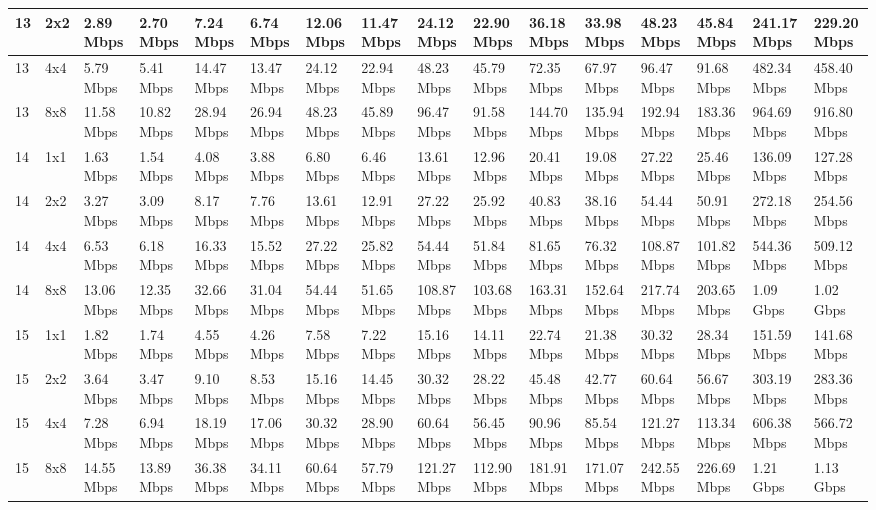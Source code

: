 \documentclass[12pt]{article}
\begin{document}
\begin{longtable}[c]{|l|l|l|l|l|l|l|l|l|l|l|l|l|l|l|l|}
13 & 2x2 & 2.89 Mbps & 2.70 Mbps & 7.24 Mbps & 6.74 Mbps & 12.06 Mbps & 11.47 Mbps & 24.12 Mbps & 22.90 Mbps & 36.18 Mbps & 33.98 Mbps & 48.23 Mbps & 45.84 Mbps & 241.17 Mbps & 229.20 Mbps \\ \hline
13 & 4x4 & 5.79 Mbps & 5.41 Mbps & 14.47 Mbps & 13.47 Mbps & 24.12 Mbps & 22.94 Mbps & 48.23 Mbps & 45.79 Mbps & 72.35 Mbps & 67.97 Mbps & 96.47 Mbps & 91.68 Mbps & 482.34 Mbps & 458.40 Mbps \\ \hline
13 & 8x8 & 11.58 Mbps & 10.82 Mbps & 28.94 Mbps & 26.94 Mbps & 48.23 Mbps & 45.89 Mbps & 96.47 Mbps & 91.58 Mbps & 144.70 Mbps & 135.94 Mbps & 192.94 Mbps & 183.36 Mbps & 964.69 Mbps & 916.80 Mbps \\ \hline
14 & 1x1 & 1.63 Mbps & 1.54 Mbps & 4.08 Mbps & 3.88 Mbps & 6.80 Mbps & 6.46 Mbps & 13.61 Mbps & 12.96 Mbps & 20.41 Mbps & 19.08 Mbps & 27.22 Mbps & 25.46 Mbps & 136.09 Mbps & 127.28 Mbps \\ \hline
14 & 2x2 & 3.27 Mbps & 3.09 Mbps & 8.17 Mbps & 7.76 Mbps & 13.61 Mbps & 12.91 Mbps & 27.22 Mbps & 25.92 Mbps & 40.83 Mbps & 38.16 Mbps & 54.44 Mbps & 50.91 Mbps & 272.18 Mbps & 254.56 Mbps \\ \hline
14 & 4x4 & 6.53 Mbps & 6.18 Mbps & 16.33 Mbps & 15.52 Mbps & 27.22 Mbps & 25.82 Mbps & 54.44 Mbps & 51.84 Mbps & 81.65 Mbps & 76.32 Mbps & 108.87 Mbps & 101.82 Mbps & 544.36 Mbps & 509.12 Mbps \\ \hline
14 & 8x8 & 13.06 Mbps & 12.35 Mbps & 32.66 Mbps & 31.04 Mbps & 54.44 Mbps & 51.65 Mbps & 108.87 Mbps & 103.68 Mbps & 163.31 Mbps & 152.64 Mbps & 217.74 Mbps & 203.65 Mbps & 1.09 Gbps & 1.02 Gbps \\ \hline
15 & 1x1 & 1.82 Mbps & 1.74 Mbps & 4.55 Mbps & 4.26 Mbps & 7.58 Mbps & 7.22 Mbps & 15.16 Mbps & 14.11 Mbps & 22.74 Mbps & 21.38 Mbps & 30.32 Mbps & 28.34 Mbps & 151.59 Mbps & 141.68 Mbps \\ \hline
15 & 2x2 & 3.64 Mbps & 3.47 Mbps & 9.10 Mbps & 8.53 Mbps & 15.16 Mbps & 14.45 Mbps & 30.32 Mbps & 28.22 Mbps & 45.48 Mbps & 42.77 Mbps & 60.64 Mbps & 56.67 Mbps & 303.19 Mbps & 283.36 Mbps \\ \hline
15 & 4x4 & 7.28 Mbps & 6.94 Mbps & 18.19 Mbps & 17.06 Mbps & 30.32 Mbps & 28.90 Mbps & 60.64 Mbps & 56.45 Mbps & 90.96 Mbps & 85.54 Mbps & 121.27 Mbps & 113.34 Mbps & 606.38 Mbps & 566.72 Mbps \\ \hline
15 & 8x8 & 14.55 Mbps & 13.89 Mbps & 36.38 Mbps & 34.11 Mbps & 60.64 Mbps & 57.79 Mbps & 121.27 Mbps & 112.90 Mbps & 181.91 Mbps & 171.07 Mbps & 242.55 Mbps & 226.69 Mbps & 1.21 Gbps & 1.13 Gbps \\ \hline

\end{longtable}
\end{document}
